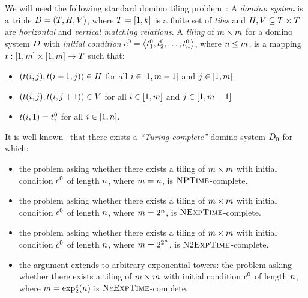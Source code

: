 
We will need the following standard domino tiling
problem~\cite[p. 403]{cervesato2008logic}:
A \emph{domino system} is a triple $D = (T, H, V)$, where
$T = [1,k]$ is a finite set of \emph{tiles} and
$H, V \subseteq {T\times T}$ are \emph{horizontal} and \emph{vertical
matching relations}.
A \emph{tiling} of $m\times m$ for a domino system $D$ with
\emph{initial condition} $c^0 = \left\langle t_{1}^0,t_{2}^0,\dots,t_{n}^0 \right\rangle$,
where $n \leq m$,
is a mapping $t : {[1,m]\times [1,m]} \to T$ such that:
\begin{itemize}
  \item $(t(i,j),t(i+1,j)) \in H$
  for all $i \in [1,m-1]$ and $j \in [1,m]$
  \item $(t(i,j),t(i,j+1)) \in V$
  for all $i \in [1,m]$ and $j \in [1,m-1]$
  \item $t(i, 1) = t_{i}^0$ for all $i \in [1,n]$.
\end{itemize}
It is well-known~\cite{boerger1997classical,van1997convenience} 
that there exists a \emph{``Turing-complete''} domino system $D_0$ for
which:
\begin{itemize}
  \item the problem asking whether there exists a tiling of $m \times m$
  with initial condition $c^0$ of length $n$, where $m = n$,
  is $\text{\normalfont{\scshape NPTime}}$-complete.
  \item the problem asking whether there exists a tiling of $m \times m$
  with initial condition $c^0$ of length $n$, where $m = 2^n$,
  is $\text{\normalfont{\scshape NExpTime}}$-complete.
  \item the problem asking whether there exists a tiling of $m \times m$
  with initial condition $c^0$ of length $n$, where $m = 2^{2^n}$,
  is $\text{\normalfont{\scshape N}}2\text{\normalfont{\scshape ExpTime}}$-complete.
  \item the argument extends to arbitrary exponential towers:
  the problem asking whether there exists a tiling of $m \times m$
  with initial condition $c^0$ of length $n$, where $m = \exp_{2}^{e}(n)$
  is $\text{\normalfont{\scshape N}}e\text{\normalfont{\scshape ExpTime}}$-complete.
\end{itemize}